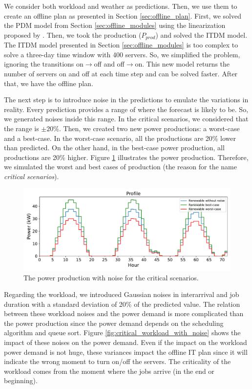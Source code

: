 We consider both workload and weather as predictions. Then, we use them to create an offline plan as presented in Section \ref{sec:offline_plan}. First, we solved the PDM model from Section \ref{sec:offline_modules} using the linearization proposed by \citeauthor{haddad2019mixed} \cite{haddad2019mixed}. Then, we took the production ($P_{prod}$) and solved the ITDM model. The ITDM model presented in Section \ref{sec:offline_modules} is too complex to solve a three-day time window with 400 servers. So, we simplified the problem, ignoring the transitions on$\rightarrow$off and off$\rightarrow$on. This new model returns the number of servers on and off at each time step and can be solved faster. After that, we have the offline plan. 

The next step is to introduce noise in the predictions to emulate the variations in reality. Every prediction provides a range of where the forecast is likely to be. So, we generated noises inside this range. In the critical scenarios, we considered that the range is $\pm 20\%$. Then, we created two new power productions: a worst-case and a best-case. In the worst-case scenario, all the productions are 20\% lower than predicted. On the other hand, in the best-case power production, all productions are 20\% higher. Figure \ref{fig:critical_weather_with_noise} illustrates the power production. Therefore, we simulated the worst and best cases of production (the reason for the name \emph{critical scenarios}).

\begin{figure}[!htb]
    \centering
    \includegraphics[scale=0.58]{Images/Compensations/critical_power_production_with_noise.pdf}
    \caption{The power production with noise for the critical scenarios.}
    \label{fig:critical_weather_with_noise}
\end{figure}

Regarding the workload, we introduced Gaussian noises in interarrival and job duration with a standard deviation of 20\% of the predicted value. The relation between these workload noises and the power demand is more complicated than the power production since the power demand depends on the scheduling algorithm and queue sort. Figure \ref{fig:critical_workload_with_noise} shows the impact of these noises on the power demand. Even if the impact on the workload power demand is not huge, these variances impact the offline IT plan since it will indicate the wrong moment to turn on/off the servers. The criticality of the workload comes from the moment where the jobs arrive (in the end or beginning).


